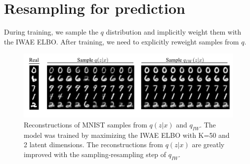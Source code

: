 \documentclass{article} %
\begin{document}






\section{Resampling for prediction}
During training, we sample the $q$ distribution and implicitly weight them with the IWAE ELBO. After training, we need to explicitly reweight samples from $q$.

\begin{figure}[H]
  \centering
      \includegraphics[width=1.\textwidth, clip, trim=0cm .5cm 0cm 0cm]{figs/samps.png}
  \caption{Reconstructions of MNIST samples from $q(z|x)$ and $q_{IW}$.
  The model was trained by maximizing the IWAE ELBO with K=50 and 2 latent dimensions. The reconstructions from $q(z|x)$ are greatly improved with the sampling-resampling step of $q_{IW}$.}
  \label{recon}
\end{figure}
\end{document}
